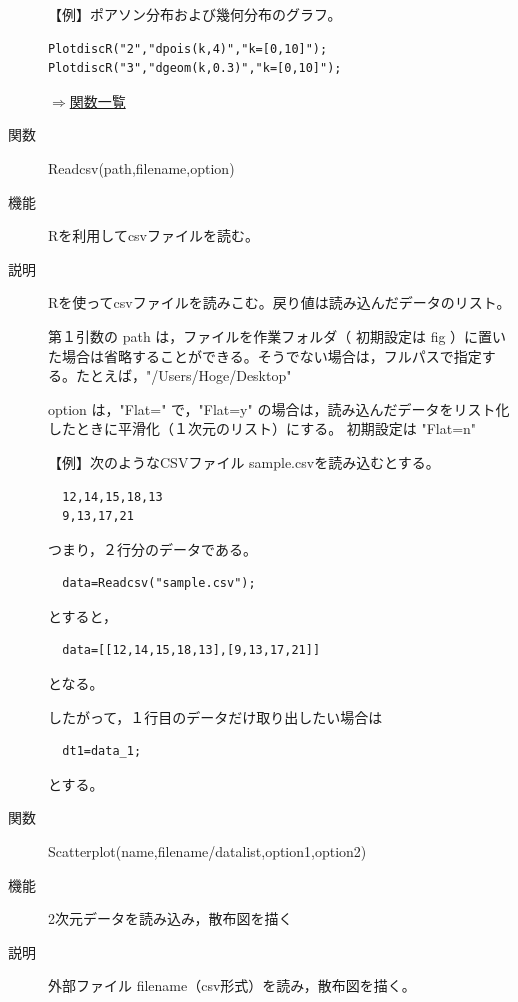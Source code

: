 \documentclass[papersize,a4paper,12pt,uplatex]{jsarticle}
\begin{document}
\begin{description}
【例】ポアソン分布および幾何分布のグラフ。
\begin{verbatim}
PlotdiscR("2","dpois(k,4)","k=[0,10]");
PlotdiscR("3","dgeom(k,0.3)","k=[0,10]");
\end{verbatim}
\begin{flushright}  \hyperlink{functionlist}{$\Rightarrow$関数一覧}\end{flushright}

\hypertarget{readcsv}{}
\item[関数]  Readcsv(path,filename,option)
\item[機能]  Rを利用してcsvファイルを読む。
\item[説明]  Rを使ってcsvファイルを読みこむ。戻り値は読み込んだデータのリスト。

第１引数の path は，ファイルを作業フォルダ（ 初期設定は fig ）に置いた場合は省略することができる。そうでない場合は，フルパスで指定する。たとえば，"/Users/Hoge/Desktop"

option は，"Flat=" で，"Flat=y" の場合は，読み込んだデータをリスト化したときに平滑化（１次元のリスト）にする。 初期設定は "Flat=n"

【例】次のようなCSVファイル sample.csvを読み込むとする。

\begin{verbatim}
  12,14,15,18,13
  9,13,17,21
\end{verbatim}

つまり，２行分のデータである。

\begin{verbatim}
  data=Readcsv("sample.csv");
\end{verbatim}

とすると，
\begin{verbatim}
  data=[[12,14,15,18,13],[9,13,17,21]]
\end{verbatim}

となる。

したがって，１行目のデータだけ取り出したい場合は

\begin{verbatim}
  dt1=data_1;
\end{verbatim}

とする。

\vspace{\baselineskip}
\hypertarget{scatterplot}{}
\item[関数]  Scatterplot(name,filename/datalist,option1,option2)
\item[機能]  2次元データを読み込み，散布図を描く
\item[説明]  外部ファイル filename（csv形式）を読み，散布図を描く。


\end{description}
\end{document}

